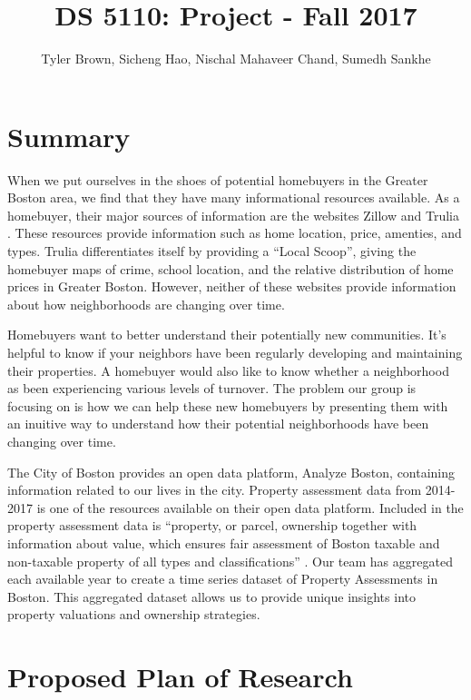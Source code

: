 \documentclass[12pt]{article}
\title{DS 5110: Project - Fall 2017}
\author{Tyler Brown, Sicheng Hao, Nischal Mahaveer Chand, Sumedh Sankhe}
\date{ }
\begin{document}
\maketitle

\section*{Summary}

When we put ourselves in the shoes of potential homebuyers in the
Greater Boston area, we find that they have many informational resources
available. As a homebuyer, their major sources of information are the
websites Zillow \cite{ZillowRe12:online} and Trulia
\cite{TruliaRe98:online}. These resources provide information such as
home location, price, amenties, and types. Trulia differentiates itself
by providing a ``Local Scoop'', giving the homebuyer maps of crime, school
location, and the relative distribution of home prices in Greater
Boston. However, neither of these websites provide information about how
neighborhoods are changing over time.

Homebuyers want to better understand their potentially new communities.
It's helpful to know if your neighbors have been regularly developing
and maintaining their properties. A homebuyer would also like to know
whether a neighborhood as been experiencing various levels of turnover.
The problem our group is focusing on is how we can help these new
homebuyers by presenting them with an inuitive way to understand how
their potential neighborhoods have been changing over time.

The City of Boston provides an open data platform, Analyze Boston, 
containing information related to our lives in the city. Property 
assessment data from 2014-2017 is one of the resources available on their
 open data platform. Included in the property assessment data is 
``property, or parcel, ownership together with information about value, 
which ensures fair assessment of Boston taxable and non-taxable property 
of all types and classifications'' \cite{Property49:online}. Our team 
has aggregated each available year to create a time series dataset of 
Property Assessments in Boston. This aggregated dataset allows us to 
provide unique insights into property valuations and ownership strategies.

\section*{Proposed Plan of Research}
\end{document}
